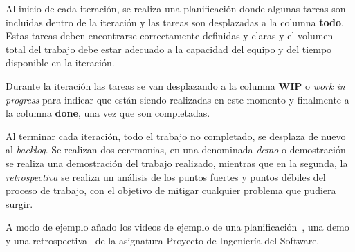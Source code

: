 Al inicio de cada iteración, se realiza una planificación donde algunas tareas son incluidas dentro de la iteración
y las tareas son desplazadas a la columna \textbf{todo}.
Estas tareas deben encontrarse correctamente definidas y claras y el volumen total del trabajo debe estar adecuado a
la capacidad del equipo y del tiempo disponible en la iteración.

Durante la iteración las tareas se van desplazando a la columna \textbf{WIP} o \textit{work in progress} para
indicar que están siendo realizadas en este momento y finalmente a la columna \textbf{done}, una vez que son
completadas.

Al terminar cada iteración, todo el trabajo no completado, se desplaza de nuevo al \textit{backlog}.
Se realizan dos ceremonias, en una denominada \textit{demo} o demostración se realiza una demostración del trabajo
realizado, mientras que en la segunda, la \textit{retrospectiva} se realiza un análisis de los puntos fuertes y
puntos débiles del proceso de trabajo, con el objetivo de mitigar cualquier problema que pudiera surgir.

A modo de ejemplo añado los videos de ejemplo de una planificación~\cite{url_viu_47_proyecto_ingenieria_sprint_6_plan},
una demo~\cite{url_viu_47_proyecto_ingenieria_sprint_6_demo} y una
retrospectiva~\cite{url_viu_47_proyecto_ingenieria_sprint_6_retrospectiva} de la asignatura Proyecto de Ingeniería del
Software.